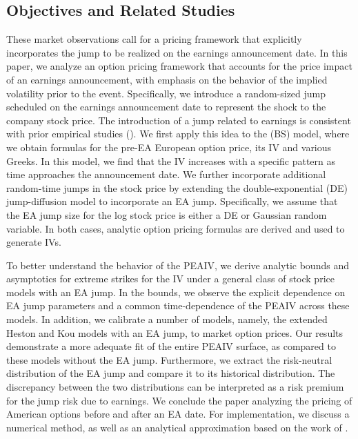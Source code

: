 \documentclass[11pt]{article}
\numberwithin{equation}{section}
\numberwithin{theorem}{section}
\begin{document}
 

\subsection{Objectives and Related Studies\label{sub:related_literature}}
These market observations call for a  pricing framework  that  explicitly incorporates the jump to be realized on the earnings announcement date.   In this paper, we analyze an option pricing framework that accounts for the price impact of an earnings announcement, with emphasis on the  behavior of the implied volatility  prior to  the event. Specifically, we   introduce  a random-sized jump scheduled on the earnings announcement date to represent the shock to the company stock price. The introduction of a jump related to earnings is consistent
with prior  empirical studies (\citet{Maheu2004,Piazzesi2005,Dubinsky2006,Lee2008}). We first apply this idea to the \cite{Black1973} (BS) model, where we  obtain formulas for  the pre-EA European option price, its IV and various Greeks.  In this model, we find that the IV increases with a specific pattern as time approaches the announcement date.  We further incorporate additional  random-time jumps in the stock price by extending the \cite{Kou2002} double-exponential (DE) jump-diffusion model to incorporate an EA jump. Specifically, we assume that the EA jump size for the log stock price is either a DE or Gaussian random variable.  In both cases,  analytic option pricing formulas are derived and used to generate  IVs.  
 
To better understand the behavior of the PEAIV, we  derive analytic bounds and asymptotics for extreme strikes for the IV under a general class of stock price models with an EA jump.  In the bounds, we observe the explicit dependence on EA jump parameters and a common time-dependence of the PEAIV across these models.  In addition, we  calibrate a number of models, namely, the extended Heston and Kou models with an EA jump,  to market option prices.  Our results demonstrate a more adequate fit of the entire PEAIV surface, as compared to these models without the EA jump. Furthermore, we    extract  the risk-neutral  distribution of the EA jump and compare it to its historical distribution.  The discrepancy between the two distributions  can be interpreted as a risk premium
for the  jump risk due to earnings. We conclude the paper analyzing the pricing of American options before and after an EA date. For implementation, we  discuss  a numerical  method, as well as an analytical approximation  based on the  work of \cite{Barone-Adesi1987}. 
\end{document}

